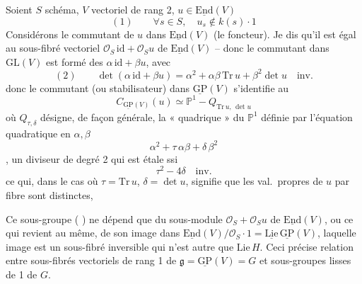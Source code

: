 \documentclass[11pt,a4paper]{article}
\begin{document}
Soient $S$ schéma,  $V$   vectoriel de rang 2,
$u \in \underline{\mathrm{End}}(V)$
\[
  (1) \qquad \forall s \in S , \quad u_s \notin k(s) \cdot 1
\]
Considérons le commutant de $u$ dans $\underline{\mathrm{End}}(V)$ (le
foncteur). Je dis qu'il est égal au sous-fibré vectoriel
$\mathcal{O}_S\,\mathrm{id} + \mathcal{O}_S u$ de $\underline{\mathrm{End}}(V)$
-- donc le commutant dans $\mathrm{GL}(V)$ est formé des
$\alpha\,\mathrm{id} + \beta u$, avec
\[
  (2) \qquad \det(\alpha\,\mathrm{id} + \beta u) = \alpha^2 + \alpha\beta\, \mathrm{Tr}\, u + \beta^2 \det u \quad \text{inv.}
\]
donc le commutant (ou stabilisateur) dans $\underline{\mathrm{GP}}(V)$
s'identifie au
\[
  C_{\underline{\mathrm{GP}}(V)}(u) \simeq \mathbb{P}^1 - Q_{\mathrm{Tr}\,u,\, \det u}
\]
où $Q_{\tau, \delta}$ désigne, de façon générale, la « quadrique » du
$\mathbb{P}^1$ définie par l'équation quadratique en $\alpha, \beta$
\[
  \alpha^2 + \tau\,\alpha\beta + \delta\,\beta^2
\]
 \ill{} \ill{}, \ill{} un diviseur de degré 2 \struck{\ill{}}
qui est étale ssi
\[
  \tau^2 - 4\delta \quad \text{inv.}
\]
ce qui, dans le cas où $\tau = \mathrm{Tr}\,u$, $\delta = \det u$, signifie
que les val.\ propres de $u$  par fibre sont distinctes,

Ce sous-groupe  (
\ill{}) ne dépend que du sous-module $\mathcal{O}_S + \mathcal{O}_S u$ de
$\underline{\mathrm{End}}(V)$, ou ce qui revient au même, de son image dans
$\underline{\mathrm{End}}(V)/\mathcal{O}_S \cdot 1 = \underline{\mathrm{Lie}}\,\underline{\mathrm{GP}}(V)$,
laquelle image est un sous-fibré inversible qui n'est autre que
$\mathrm{Lie}\, H$. Ceci précise relation entre sous-fibrés vectoriels
 de rang 1 de $\mathfrak{g} = \underline{\mathrm{GP}}(V) = G$
et sous-groupes   lisses de 
 1 de $G$.
\end{document}
